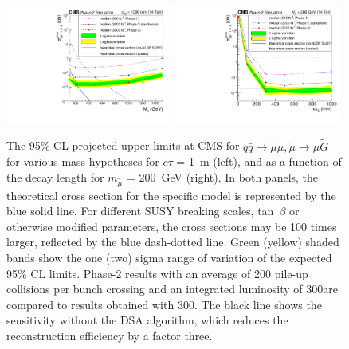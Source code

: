 \begin{figure}[t]\begin{center}
\includegraphics[width=0.49\textwidth]{figures/LimitComparison_withStandAloneEff.pdf}
\includegraphics[width=0.49\textwidth]{figures/LimitComparison_asfuncofCtau.pdf}
\caption{The 95\% CL projected upper limits at CMS for $q \bar q \to \widetilde{\mu} \widetilde{\mu}, \widetilde{\mu}\rightarrow \mu\widetilde{G}$ for various mass hypotheses for $c\tau$ = 1~m (left), and as a function of the decay length for $m_{\widetilde{\mu}}$ = 200~GeV (right). In both panels, the theoretical cross section for the specific model is represented by the blue solid line. For different SUSY breaking scales, tan~$\beta$ or otherwise modified parameters, the cross sections may be 100 times larger, reflected by the blue dash-dotted line. Green (yellow) shaded bands show the one (two) sigma range of variation of the expected 95\% CL limits. Phase-2 results with an average of 200 pile-up collisions per bunch crossing and an integrated luminosity of $300$\fbinv are compared to results obtained with $300$\fbinv. The black line shows the sensitivity without the DSA algorithm, which reduces the reconstruction efficiency by a factor three.
 }
\label{fig:displResults}
\end{center}
\end{figure}

